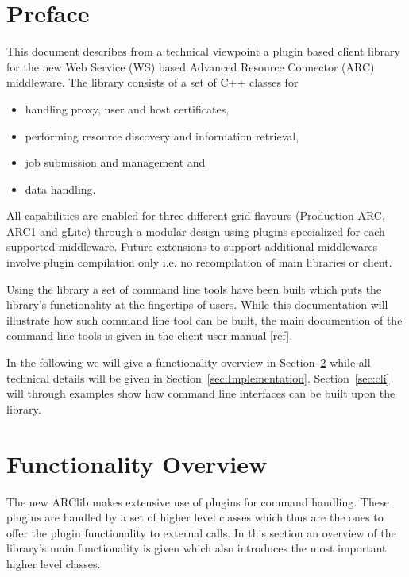 \documentclass{book}
\begin{document}
\tableofcontents                          %
\newpage
\chapter{Preface}
\label{sec:intro}

This document describes from a technical viewpoint a plugin based client library for the new 
Web Service (WS) based Advanced Resource Connector (ARC) middleware. The library consists of 
a set of C++ classes for 

\begin{itemize}
\item{handling proxy, user and host certificates,}
\item{performing resource discovery and information retrieval,}
\item{job submission and management and}
\item{data handling.}
\end{itemize}

All capabilities are enabled for three different grid flavours (Production ARC, ARC1 and gLite) 
through a modular design using plugins specialized for each supported middleware. Future 
extensions to support additional middlewares involve plugin compilation only i.e. no recompilation 
of main libraries or client.

Using the library a set of command line tools have been built which puts the library's functionality 
at the fingertips of users. While this documentation will illustrate how such command line tool can be 
built, the main documention of the command line tools is given in the client user manual [ref].

In the following we will give a functionality overview in Section~\ref{sec:FuncOver} while all technical 
details will be given in Section~\ref{sec:Implementation}. Section~\ref{sec:cli} will through examples 
show how command line interfaces can be built upon the library.

\chapter{Functionality Overview}
\label{sec:FuncOver}
The new ARClib makes extensive use of plugins for command handling. These plugins are handled by a set 
of higher level classes which thus are the ones to offer the plugin functionality to external calls. In 
this section an overview of the library's main functionality is given which also introduces the most 
important higher level classes.
\end{document}
